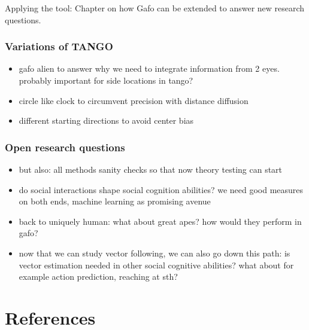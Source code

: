 \documentclass[
]{scrbook}
\providecommand{\tightlist}{%
  \setlength{\itemsep}{0pt}\setlength{\parskip}{0pt}}
\begin{document}
Applying the tool: Chapter on how Gafo can be extended to answer new research questions.

\subsection{Variations of TANGO}\label{variations-of-tango}

\begin{itemize}
\tightlist
\item
  gafo alien to answer why we need to integrate information from 2 eyes. probably important for side locations in tango?
\item
  circle like clock to circumvent precision with distance diffusion
\item
  different starting directions to avoid center bias
\end{itemize}

\subsection{Open research questions}\label{open-research-questions}

\begin{itemize}
\tightlist
\item
  but also: all methods sanity checks so that now theory testing can start
\item
  do social interactions shape social cognition abilities? we need good measures on both ends, machine learning as promising avenue
\item
  back to uniquely human: what about great apes? how would they perform in gafo?
\item
  now that we can study vector following, we can also go down this path: is vector estimation needed in other social cognitive abilities? what about for example action prediction, reaching at sth?
\end{itemize}

\backmatter

\chapter{References}\label{references}
\end{document}
